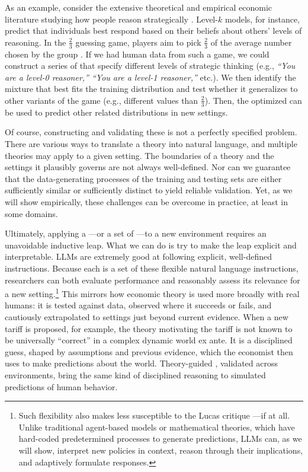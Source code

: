 As an example, consider the extensive theoretical and empirical economic literature studying how people reason strategically \citep{STAHL1994,STAHL1995,1120Arad2012, Camerer2004Cognitive}.
Level-$k$ models, for instance, predict that individuals best respond based on their beliefs about others' levels of reasoning. 
In the $\frac{2}{3}$ guessing game, players aim to pick $\frac{2}{3}$ of the average number chosen by the group \citep{LkNagel1995,keynes1936general}. 
If we had human data from such a game, we could construct a series of  that specify different levels of strategic thinking (e.g., \emph{``You are a level-0 reasoner,'' ``You are a level-1 reasoner,''} etc.).
We then identify the mixture that best fits the training distribution and test whether it generalizes to other variants of the game (e.g., different values than $\frac{2}{3}$).
Then, the optimized  can be used to predict other related distributions in new settings.

Of course, constructing and validating these  is not a perfectly specified problem.
There are various ways to translate a theory into natural language, and multiple theories may apply to a given setting.
The boundaries of a theory and the settings it plausibly governs are not always well-defined.
Nor can we guarantee that the data-generating processes of the training and testing sets are either sufficiently similar or sufficiently distinct to yield reliable validation.
Yet, as we will show empirically, these challenges can be overcome in practice, at least in some domains.

Ultimately, applying a \persona{}---or a set of ---to a new environment requires an unavoidable inductive leap.
What we can do is try to make the leap explicit and interpretable.  
LLMs are extremely good at following explicit, well-defined instructions.
Because each \persona{} is a set of these flexible natural language instructions, researchers can both evaluate performance and reasonably assess its relevance for a new setting.\footnote{Such flexibility also makes  less susceptible to the Lucas critique \citep{Lucas1976Critique}---if at all.
Unlike traditional agent-based models or mathematical theories, which have hard-coded predetermined processes to generate predictions, LLMs can, as we will show, interpret new policies in context, reason through their implications, and adaptively formulate responses.
}
This mirrors how economic theory is used more broadly with real humans: it is tested against data, observed where it succeeds or fails, and cautiously extrapolated to settings just beyond current evidence.
When a new tariff is proposed, for example, the theory motivating the tariff is not known to be universally ``correct'' in a complex dynamic world ex ante.
It is a disciplined guess, shaped by assumptions and previous evidence, which the economist then uses to make predictions about the world.
Theory-guided , validated across environments, bring the same kind of disciplined reasoning to simulated \aisub{} predictions of human behavior.
